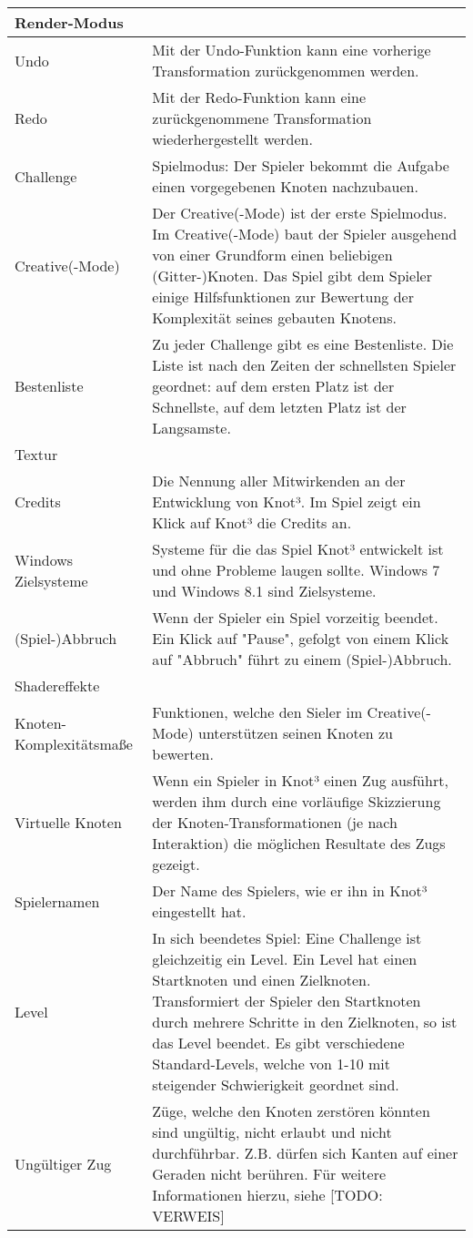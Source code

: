 \begin{longtable}{|p{}|p{}|}
\hline 
Render-Modus &  %
\\
\hline
Undo & Mit der Undo-Funktion kann eine vorherige Transformation zurückgenommen werden.
\\
\hline
Redo & Mit der Redo-Funktion kann eine zurückgenommene Transformation wiederhergestellt werden.
\\
\hline
Challenge & Spielmodus: Der Spieler bekommt die Aufgabe einen vorgegebenen Knoten nachzubauen.\\
\hline
Creative(-Mode) & Der Creative(-Mode) ist der erste Spielmodus. Im Creative(-Mode) baut der Spieler ausgehend von einer Grundform einen beliebigen (Gitter-)Knoten. Das Spiel gibt dem Spieler einige Hilfsfunktionen zur Bewertung der Komplexität seines gebauten Knotens.\\
\hline
Bestenliste & Zu jeder Challenge gibt es eine Bestenliste. 
Die Liste ist nach den Zeiten der schnellsten Spieler geordnet: auf dem ersten Platz ist der Schnellste, auf dem letzten Platz ist der Langsamste.
\\
\hline
Textur & \\ %
\hline
Credits & Die Nennung aller Mitwirkenden an der Entwicklung von Knot³. Im Spiel zeigt ein Klick auf Knot³ die Credits an.\\
\hline
Windows Zielsysteme & Systeme für die das Spiel Knot³ entwickelt ist und ohne Probleme laugen sollte. Windows 7 und Windows 8.1 sind Zielsysteme.\\
\hline
(Spiel-)Abbruch & Wenn der Spieler ein Spiel vorzeitig beendet. Ein Klick auf "Pause", gefolgt von einem Klick auf "Abbruch" führt zu einem (Spiel-)Abbruch.\\
\hline
Shadereffekte & \\
\hline
Knoten-Komplexitätsmaße & Funktionen, welche den Sieler im Creative(-Mode) unterstützen seinen Knoten zu bewerten.\\
\hline
Virtuelle Knoten & Wenn ein Spieler in Knot³ einen Zug ausführt, werden ihm durch eine vorläufige Skizzierung der Knoten-Transformationen (je nach Interaktion) die möglichen Resultate des Zugs gezeigt. \\
\hline
Spielernamen & Der Name des Spielers, wie er ihn in Knot³ eingestellt hat.\\
\hline
Level & In sich beendetes Spiel: Eine Challenge ist gleichzeitig ein Level. Ein Level hat einen Startknoten und einen Zielknoten. Transformiert der Spieler den Startknoten durch mehrere Schritte in den Zielknoten, so ist das Level beendet. Es gibt verschiedene Standard-Levels, welche von 1-10 mit steigender Schwierigkeit geordnet sind.\\
\hline
Ungültiger Zug & Züge, welche den Knoten zerstören könnten sind ungültig, nicht erlaubt und nicht durchführbar. Z.B. dürfen sich Kanten auf einer Geraden nicht berühren. Für weitere Informationen hierzu, siehe {\color{red}[TODO: VERWEIS]}\\
\hline
\end{longtable}
